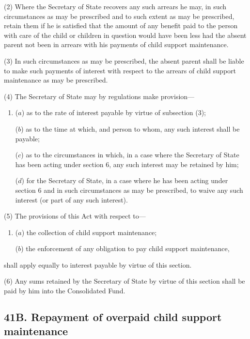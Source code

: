 \documentclass[12pt,a4paper]{article}
\begin{document}
(2) Where the Secretary of State recovers any such arrears he may, in such circumstances as may be prescribed and to such extent as may be prescribed, retain them if he is satisfied that the amount of any benefit paid to the person with care of the child or children in question would have been less had the absent parent not been in arrears with his payments of child support maintenance.

(3) In such circumstances as may be prescribed, the absent parent shall be liable to make such payments of interest with respect to the arrears of child support maintenance as may be prescribed.

(4) The Secretary of State may by regulations make provision—
\begin{enumerate}\item[]
($a$) as to the rate of interest payable by virtue of subsection (3);

($b$) as to the time at which, and person to whom, any such interest shall be payable;

($c$) as to the circumstances in which, in a case where the Secretary of State has been acting under section 6, any such interest may be retained by him;

($d$) for the Secretary of State, in a case where he has been acting under section 6 and in such circumstances as may be prescribed, to waive any such interest (or part of any such interest).
\end{enumerate}

(5) The provisions of this Act with respect to—
\begin{enumerate}\item[]
($a$) the collection of child support maintenance;

($b$) the enforcement of any obligation to pay child support maintenance,
\end{enumerate}
shall apply equally to interest payable by virtue of this section.

(6) Any sums retained by the Secretary of State by virtue of this section shall be paid by him into the Consolidated Fund.


\subsection{41B. Repayment of overpaid child support maintenance}
\end{document}
